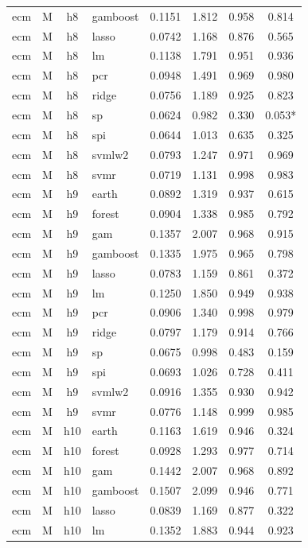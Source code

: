 \begin{ThreePartTable}
\begin{longtable}[t]{llclcccc}
ecm & M & h8 & gamboost & 0.1151 & 1.812 & 0.958 & 0.814\\
ecm & M & h8 & lasso & 0.0742 & 1.168 & 0.876 & 0.565\\
ecm & M & h8 & lm & 0.1138 & 1.791 & 0.951 & 0.936\\
ecm & M & h8 & pcr & 0.0948 & 1.491 & 0.969 & 0.980\\
ecm & M & h8 & ridge & 0.0756 & 1.189 & 0.925 & 0.823\\
ecm & M & h8 & sp & 0.0624 & 0.982 & 0.330 & 0.053*\\
ecm & M & h8 & spi & 0.0644 & 1.013 & 0.635 & 0.325\\
ecm & M & h8 & svmlw2 & 0.0793 & 1.247 & 0.971 & 0.969\\
ecm & M & h8 & svmr & 0.0719 & 1.131 & 0.998 & 0.983\\
\addlinespace
ecm & M & h9 & earth & 0.0892 & 1.319 & 0.937 & 0.615\\
ecm & M & h9 & forest & 0.0904 & 1.338 & 0.985 & 0.792\\
ecm & M & h9 & gam & 0.1357 & 2.007 & 0.968 & 0.915\\
ecm & M & h9 & gamboost & 0.1335 & 1.975 & 0.965 & 0.798\\
ecm & M & h9 & lasso & 0.0783 & 1.159 & 0.861 & 0.372\\
ecm & M & h9 & lm & 0.1250 & 1.850 & 0.949 & 0.938\\
ecm & M & h9 & pcr & 0.0906 & 1.340 & 0.998 & 0.979\\
ecm & M & h9 & ridge & 0.0797 & 1.179 & 0.914 & 0.766\\
ecm & M & h9 & sp & 0.0675 & 0.998 & 0.483 & 0.159\\
ecm & M & h9 & spi & 0.0693 & 1.026 & 0.728 & 0.411\\
ecm & M & h9 & svmlw2 & 0.0916 & 1.355 & 0.930 & 0.942\\
ecm & M & h9 & svmr & 0.0776 & 1.148 & 0.999 & 0.985\\
\addlinespace
ecm & M & h10 & earth & 0.1163 & 1.619 & 0.946 & 0.324\\
ecm & M & h10 & forest & 0.0928 & 1.293 & 0.977 & 0.714\\
ecm & M & h10 & gam & 0.1442 & 2.007 & 0.968 & 0.892\\
ecm & M & h10 & gamboost & 0.1507 & 2.099 & 0.946 & 0.771\\
ecm & M & h10 & lasso & 0.0839 & 1.169 & 0.877 & 0.322\\
ecm & M & h10 & lm & 0.1352 & 1.883 & 0.944 & 0.923\\

\end{longtable}
\end{ThreePartTable}
